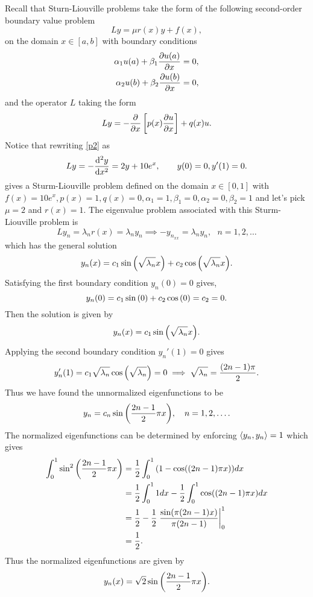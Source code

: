 \documentclass[12pt]{report}
\begin{document}
\begin{solution}
    Recall that Sturn-Liouville problems take the form of the following second-order boundary value problem 
    \[ 
        Ly = \mu r(x) y + f(x),
    \]
    on the domain $x \in [a,b]$ with boundary conditions
    \begin{align*}
        \alpha_1 u(a) + \beta_1 \frac{\partial u(a)}{\partial x} &= 0,\\
        \alpha_2 u(b) + \beta_2 \frac{\partial u(b)}{\partial x} &= 0,
    \end{align*}
    and the operator $L$ taking the form
    \[ 
        Ly = -\frac{\partial }{\partial x} \left[ p(x) \frac{\partial u}{\partial x} \right] + q(x)u.
    \]
    Notice that rewriting \ref{p2} as 
    \[ 
        Ly = -\frac{\mathrm{d}^{2} y}{\mathrm{d} x^{2}} = 2y + 10 e^x, ~~~~~~ y(0) = 0, y'(1) = 0.
    \]
    gives a Sturm-Liouville problem defined on the domain $x \in [0, 1]$ with $f(x) = 10e^x, p(x) = 1, q(x) = 0, \alpha_1 = 1, \beta_1 = 0, \alpha_2 = 0, \beta_2 = 1$ and let's pick $\mu = 2$ and $r(x) = 1$. The eigenvalue problem associated with this Sturm-Liouville problem is
    \[ 
        Ly_n = \lambda_n r(x) = \lambda_n y_n \implies - y_{n_{xx}} = \lambda_n y_n, ~~~ n = 1, 2, \dots
    \]
    which has the general solution
    \[ 
        y_n(x) = c_1 \sin {\left( \sqrt{\lambda_n} x\right)} + c_2 \cos {\left( \sqrt{\lambda_n} x\right)}.
    \]
    Satisfying the first boundary condition $y_n(0) = 0$ gives,
    \[ 
        y_n(0) = c_1 \sin {\left(0\right)} + c_2 \cos {\left(0\right)} = c_2 = 0.
    \]
    Then the solution is given by
    \[ 
        y_n(x) = c_1 \sin {\left( \sqrt{\lambda_n} x\right)}.
    \]
    Applying the second boundary condition $y_n'(1) = 0$ gives
    \[ 
        y'_n(1) = c_1 \sqrt{\lambda_n} \cos{\left( \sqrt{\lambda_n}\right)} = 0 \implies \sqrt{\lambda_n} = \frac{(2n  - 1)\pi}{2}.
    \]
    Thus we have found the unnormalized eigenfunctions to be
    \[ 
        y_n = c_n \sin{\left( \frac{2n - 1}{2} \pi x\right)}, ~~~  n = 1, 2, \dots.
    \]
    The normalized eigenfunctions can be determined by enforcing ${\left\langle y_n, y_n\right\rangle} = 1$ which gives
    \begin{align*}
        \int_0^1 \sin^2{\left( \frac{2n - 1}{2} \pi x\right)} &= \frac{1}{2} \int_0^1 {\left(1 - \cos((2n - 1)\pi x)\right)}dx\\
        &= \frac{1}{2} \int_0^1 1 dx - \frac{1}{2}\int_0^1 \cos((2n - 1)\pi x)dx\\
        &= \frac{1}{2} - \frac{1}{2} \left. \frac{\sin (\pi  (2 n-1) x)}{\pi  (2 n-1)} \right|_0^1\\
        &= \frac{1}{2}.
    \end{align*}
    Thus the normalized eigenfunctions are given by
    \[ 
        y_n(x)  = \sqrt{2} \sin{\left( \frac{2n - 1}{2} \pi x\right)}.
\]
\end{solution}
\end{document}
